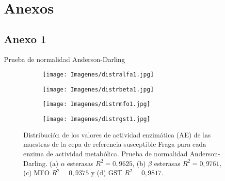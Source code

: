 















\chapter*{\Huge Anexos}\label{chapter:anexos}


\setcounter{figure}{0}
\section *{Anexo 1} \label{ane1}
 \begin{center}
	{\Large Prueba de normalidad Anderson-Darling}
\end{center}
\medskip
\medskip
\medskip
\medskip
\begin{figure}[h]
\begin{subfigure}{.5\textwidth}
	\centering
	\texttt{[image: Imagenes/distralfa1.jpg]}
	\caption{}
	\label{distralfa}
\end{subfigure}
\begin{subfigure}{.5\textwidth}
	\centering
	\texttt{[image: Imagenes/distrbeta1.jpg]}
	\caption{}
	\label{distrbeta}
\end{subfigure}
\par\bigskip
\begin{subfigure}{.5\textwidth}
	\centering
	\texttt{[image: Imagenes/distrmfo1.jpg]}
	\caption{}
	\label{distrmfo}
\end{subfigure}
\begin{subfigure}{.5\textwidth}
	\centering
	\texttt{[image: Imagenes/distrgst1.jpg]}
	\caption{}
	\label{distrgst}
\end{subfigure}
\caption{Distribución de los valores de actividad enzimática (AE) de las muestras de la cepa de referencia susceptible Fraga para cada enzima de actividad metabólica. Prueba de normalidad Anderson-Darling. (a) $\alpha$ esterasas $R^{2}=0,9625$, (b) $\beta$ esterasas $R^{2}=0,9761$, (c) MFO $R^{2}=0,9375$ y (d) GST $R^{2}=0,9817$.}
\label{distribucion}
\end{figure}


